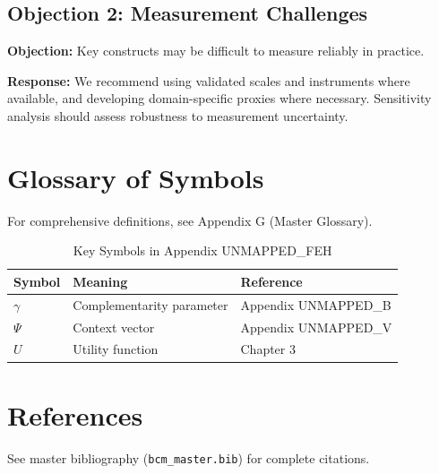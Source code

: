 \subsection{Objection 2: Measurement Challenges}

\textbf{Objection:} Key constructs may be difficult to measure reliably in
practice.

\textbf{Response:} We recommend using validated scales and instruments where
available, and developing domain-specific proxies where necessary. Sensitivity
analysis should assess robustness to measurement uncertainty.



\section{Glossary of Symbols}
\label{sec:feh-glossary}

For comprehensive definitions, see Appendix G (Master Glossary).

\begin{table}[htbp]
\centering
\caption{Key Symbols in Appendix UNMAPPED_FEH}
\begin{tabular}{lll}
\toprule
\textbf{Symbol} & \textbf{Meaning} & \textbf{Reference} \\
\midrule
$\gamma$ & Complementarity parameter & Appendix UNMAPPED_B \\
$\Psi$ & Context vector & Appendix UNMAPPED_V \\
$U$ & Utility function & Chapter 3 \\
\bottomrule
\end{tabular}
\end{table}


\section{References}
\label{sec:feh-references}

See master bibliography (\texttt{bcm\_master.bib}) for complete citations.

\nocite{bcm_master}

